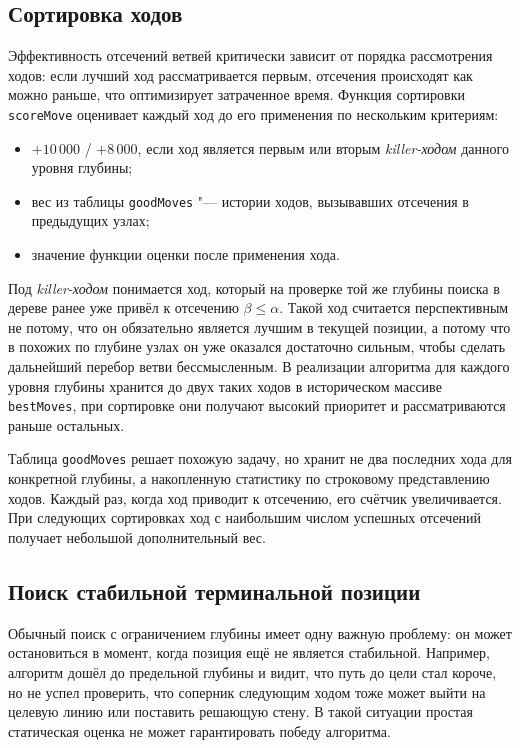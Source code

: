 \documentclass[a4paper,12pt]{diplom}
\renewcommand{\le}{\leqslant}
\begin{document}
\subsection*{Сортировка ходов}

Эффективность отсечений ветвей критически зависит от порядка рассмотрения ходов: если лучший ход рассматривается первым, отсечения происходят как можно раньше, что оптимизирует затраченное время. Функция сортировки \texttt{scoreMove} оценивает каждый ход до его применения по нескольким критериям:
\begin{itemize}
    \item $+10\,000$ / $+8\,000$, если ход является первым или вторым \textit{killer-ходом} данного уровня глубины;
    \item вес из таблицы \texttt{goodMoves} "--- истории ходов, вызывавших отсечения в предыдущих узлах;
    \item значение функции оценки после применения хода.
\end{itemize}

Под \textit{killer-ходом} понимается ход, который на проверке той же глубины поиска в дереве ранее уже привёл к отсечению $\beta \le \alpha$. Такой ход считается перспективным не потому, что он обязательно является лучшим в текущей позиции, а потому что в похожих по глубине узлах он уже оказался достаточно сильным, чтобы сделать дальнейший перебор ветви бессмысленным. В реализации алгоритма для каждого уровня глубины хранится до двух таких ходов в историческом массиве \texttt{bestMoves}, при сортировке они получают высокий приоритет и рассматриваются раньше остальных.

Таблица \texttt{goodMoves} решает похожую задачу, но хранит не два последних хода для конкретной глубины, а накопленную статистику по строковому представлению ходов. Каждый раз, когда ход приводит к отсечению, его счётчик увеличивается. При следующих сортировках ход с наибольшим числом успешных отсечений получает небольшой дополнительный вес.

\subsection*{Поиск стабильной терминальной позиции}

Обычный поиск с ограничением глубины имеет одну важную проблему: он может остановиться в момент, когда позиция ещё не является стабильной. Например, алгоритм дошёл до предельной глубины и видит, что путь до цели стал короче, но не успел проверить, что соперник следующим ходом тоже может выйти на целевую линию или поставить решающую стену. В такой ситуации простая статическая оценка не может гарантировать победу алгоритма.
\end{document}
